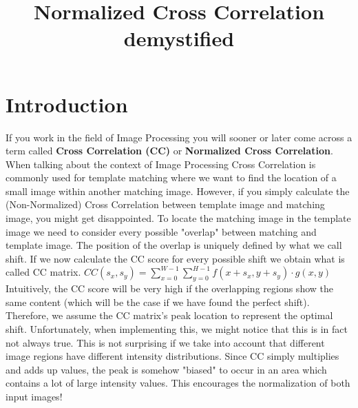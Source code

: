 \documentclass{article}
\begin{document}
\title{Normalized Cross Correlation demystified}

\maketitle

\section{Introduction}
If you work in the field of Image Processing you will sooner or later come across a term called \textbf{Cross Correlation (CC)} or \textbf{Normalized Cross Correlation}. 
\newline \newline
When talking about the context of Image Processing Cross Correlation is commonly used for template matching where we want to find the location of a small image within another matching image.
\newline \newline
However, if you simply calculate the (Non-Normalized) Cross Correlation  between template image and matching image, you might get disappointed. To locate the matching image in the template image we need to consider every possible "overlap" between matching and template image. The position of the overlap is uniquely defined by what we call shift. If we now calculate the CC score for every possible shift we obtain what is called CC matrix.
\newline \newline
$CC(s_x, s_y) = \sum_{x=0}^{W-1} \sum_{y=0}^{H-1} f(x+s_x,y+s_y) \cdot g(x,y)$
\newline \newline
Intuitively, the CC score will be very high if the overlapping regions show the same content (which will be the case if we have found the perfect shift). Therefore, we assume the CC matrix's peak location to represent the optimal shift.
\newline \newline
Unfortunately, when implementing this, we might notice that this is in fact not always true. This is not surprising if we take into account that different image regions have different intensity distributions. Since CC simply multiplies and adds up values, the peak is somehow "biased" to occur in an area which contains a lot of large intensity values.
\newline \newline
This encourages the normalization of both input images!
\end{document}

